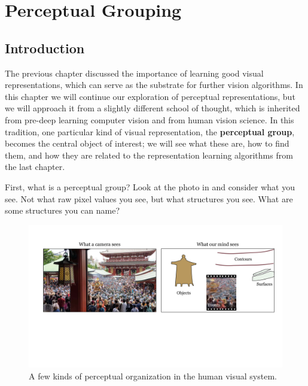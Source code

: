 \chapter{Perceptual Grouping}\label{chapter:perceptual_organization}

\section{Introduction}

The previous chapter discussed the importance of learning good visual representations, which can serve as the substrate for further vision algorithms. In this chapter we will continue our exploration of perceptual representations, but we will approach it from a slightly different school of thought, which is inherited from pre-deep learning computer vision and from human vision science. In this tradition, one particular kind of visual representation, the \textbf{perceptual group}, becomes the central object of interest; we will see what these are, how to find them, and how they are related to the representation learning algorithms from the last chapter.

First, what is a perceptual group? Look at the photo in \fig{\ref{fig:perceptual_organization:perc_org_teaser}} and consider what you see. Not what raw pixel values you see, but what structures you see. What are some structures you can name?
\begin{figure}[h!]
    \centerline{
        \includegraphics[width=1.0\linewidth]{./figures/perceptual_organization/perc_org_teaser.pdf}
    }
    \caption{A few kinds of perceptual organization in the human visual system.}
    \label{fig:perceptual_organization:perc_org_teaser}
\end{figure}

